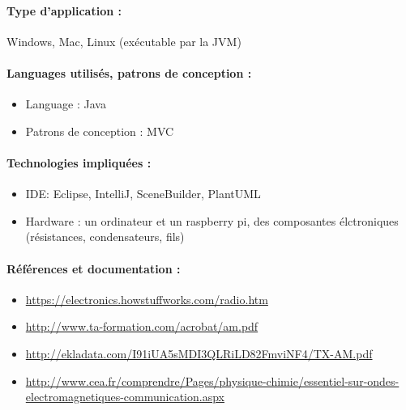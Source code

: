 \paragraph{Type d'application :}
Windows, Mac, Linux (exécutable par la JVM)
\paragraph{Languages utilisés, patrons de conception :}
\begin{itemize}
    \item Language : Java
    \item Patrons de conception : MVC
\end{itemize}

\paragraph{Technologies impliquées :}
\begin{itemize}
    \item IDE: Eclipse, IntelliJ, SceneBuilder, PlantUML
    \item Hardware : un ordinateur et un raspberry pi, des composantes élctroniques (résistances, condensateurs, fils)
\end{itemize}

\paragraph{Références et documentation :}
\begin{itemize}
    \item \url{https://electronics.howstuffworks.com/radio.htm}
    \item \url{http://www.ta-formation.com/acrobat/am.pdf}
    \item \url{http://ekladata.com/I91iUA5sMDI3QLRiLD82FmviNF4/TX-AM.pdf}
    \item \url{http://www.cea.fr/comprendre/Pages/physique-chimie/essentiel-sur-ondes-electromagnetiques-communication.aspx}
\end{itemize}
